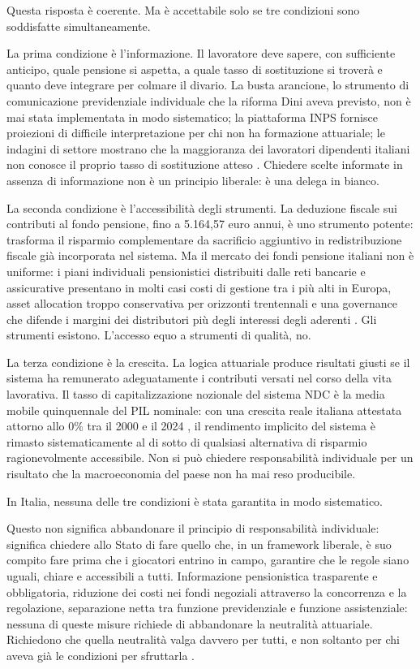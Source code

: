 Questa risposta è coerente. Ma è accettabile solo se tre condizioni sono
soddisfatte simultaneamente.

La prima condizione è l'informazione.
Il lavoratore deve sapere, con sufficiente anticipo, quale pensione si
aspetta, a quale tasso di sostituzione si troverà e quanto deve integrare
per colmare il divario.
La busta arancione, lo strumento di comunicazione previdenziale
individuale che la riforma Dini aveva previsto, non è mai stata
implementata in modo sistematico; la piattaforma INPS fornisce proiezioni
di difficile interpretazione per chi non ha formazione attuariale; le
indagini di settore mostrano che la maggioranza dei lavoratori dipendenti
italiani non conosce il proprio tasso di sostituzione atteso
\cite{Fornero2018, Lavoce2024a}.
Chiedere scelte informate in assenza di informazione non è un principio
liberale: è una delega in bianco.

La seconda condizione è l'accessibilità degli strumenti.
La deduzione fiscale sui contributi al fondo pensione, fino a 5.164,57
euro annui, è uno strumento potente: trasforma il risparmio complementare
da sacrificio aggiuntivo in redistribuzione fiscale già incorporata nel
sistema.
Ma il mercato dei fondi pensione italiani non è uniforme: i piani
individuali pensionistici distribuiti dalle reti bancarie e assicurative
presentano in molti casi costi di gestione tra i più alti in Europa,
asset allocation troppo conservativa per orizzonti trentennali e una
governance che difende i margini dei distributori più degli interessi
degli aderenti \cite{Bosi2018, Lavoce2024a}.
Gli strumenti esistono. L'accesso equo a strumenti di qualità, no.

La terza condizione è la crescita.
La logica attuariale produce risultati giusti se il sistema ha remunerato
adeguatamente i contributi versati nel corso della vita lavorativa.
Il tasso di capitalizzazione nozionale del sistema NDC è la media mobile
quinquennale del PIL nominale: con una crescita reale italiana attestata
attorno allo 0\% tra il 2000 e il 2024 \cite{MEFRGS2025}, il rendimento
implicito del sistema è rimasto sistematicamente al di sotto di qualsiasi
alternativa di risparmio ragionevolmente accessibile.
Non si può chiedere responsabilità individuale per un risultato che la
macroeconomia del paese non ha mai reso producibile.

In Italia, nessuna delle tre condizioni è stata garantita in modo
sistematico.

Questo non significa abbandonare il principio di responsabilità
individuale: significa chiedere allo Stato di fare quello che, in un
framework liberale, è suo compito fare prima che i giocatori entrino in
campo, garantire che le regole siano uguali, chiare e accessibili a tutti.
Informazione pensionistica trasparente e obbligatoria, riduzione dei costi
nei fondi negoziali attraverso la concorrenza e la regolazione, separazione
netta tra funzione previdenziale e funzione assistenziale: nessuna di
queste misure richiede di abbandonare la neutralità attuariale.
Richiedono che quella neutralità valga davvero per tutti, e non soltanto
per chi aveva già le condizioni per sfruttarla \cite{Fornero2018, Artoni2014}.

